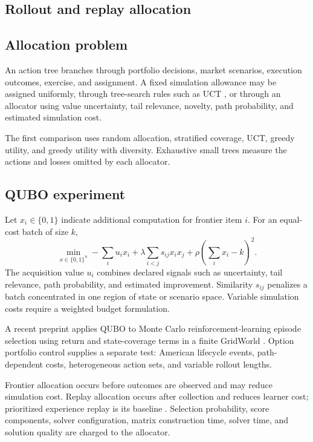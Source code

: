 \documentclass{strategynet-journal}
\begin{document}
\begin{SNcolumns}

\section{Rollout and replay allocation}
\label{sec:allocation}

\subsection{Allocation problem}

An action tree branches through portfolio decisions, market scenarios,
execution outcomes, exercise, and assignment.  A fixed simulation allowance
may be assigned uniformly, through tree-search rules such as UCT
\cite{uct}, or through an allocator using value uncertainty, tail relevance,
novelty, path probability, and estimated simulation cost.

The first comparison uses random allocation, stratified coverage, UCT, greedy
utility, and greedy utility with diversity.  Exhaustive small trees measure
the actions and losses omitted by each allocator.

\subsection{QUBO experiment}

Let \(x_i\in\{0,1\}\) indicate additional computation for frontier item \(i\).
For an equal-cost batch of size \(k\),
\[
  \min_{x\in\{0,1\}^n}
  -\sum_i u_ix_i
  +\lambda\sum_{i<j}s_{ij}x_ix_j
  +\rho\left(\sum_i x_i-k\right)^2.
\]
The acquisition value \(u_i\) combines declared signals such as uncertainty,
tail relevance, path probability, and estimated improvement.  Similarity
\(s_{ij}\) penalizes a batch concentrated in one region of state or scenario
space.  Variable simulation costs require a weighted budget formulation.

A recent preprint applies QUBO to Monte Carlo reinforcement-learning episode
selection using return and state-coverage terms in a finite GridWorld
\cite{quboepisodes}.  Option portfolio control supplies a separate test:
American lifecycle events, path-dependent costs, heterogeneous action sets,
and variable rollout lengths.

Frontier allocation occurs before outcomes are observed and may reduce
simulation cost.  Replay allocation occurs after collection and reduces
learner cost; prioritized experience replay is its baseline \cite{per}.
Selection probability, score components, solver configuration, matrix
construction time, solver time, and solution quality are charged to the
allocator.


\end{SNcolumns}
\end{document}
